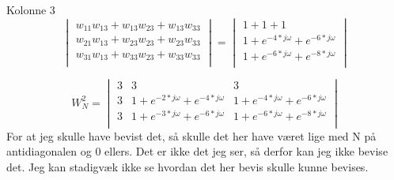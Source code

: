 \begin{Opgaver}
\begin{kapitel}
\begin{Opgave}
\begin{UnderOpgave}
                Kolonne 3 
                \[\begin{vmatrix}
                    w_{11}w_{13} + w_{13}w_{23} +w_{13}w_{33} \\
                    w_{21}w_{13} + w_{23}w_{23} +w_{23}w_{33} \\
                    w_{31}w_{13} + w_{33}w_{23} +w_{33}w_{33} \\ 
                \end{vmatrix}
                = 
                \begin{vmatrix}
                    1 + 1 + 1                               \\
                    1 + e^{-4 * j\omega} + e^{-6 * j\omega} \\
                    1 + e^{-6 * j\omega} + e^{-8 * j\omega} \\
                \end{vmatrix}\]
                

                \[W_N^2 = \begin{vmatrix}
                    3 &                                       3 &                                       3 \\                 
                    3 & 1 + e^{-2 * j\omega} + e^{-4 * j\omega} & 1 + e^{-4 * j\omega} + e^{-6 * j\omega} \\
                    3 & 1 + e^{-3 * j\omega} + e^{-6 * j\omega} & 1 + e^{-6 * j\omega} + e^{-8 * j\omega} \\
                \end{vmatrix}\]
                For at jeg skulle have bevist det, så skulle det her have været lige med N på antidiagonalen og 0 ellers.
                Det er ikke det jeg ser, så derfor kan jeg ikke bevise det. 
                Jeg kan stadigvæk ikke se hvordan det her bevis skulle kunne bevises. 


\end{UnderOpgave}
\end{Opgave}
\end{kapitel}
\end{Opgaver}
